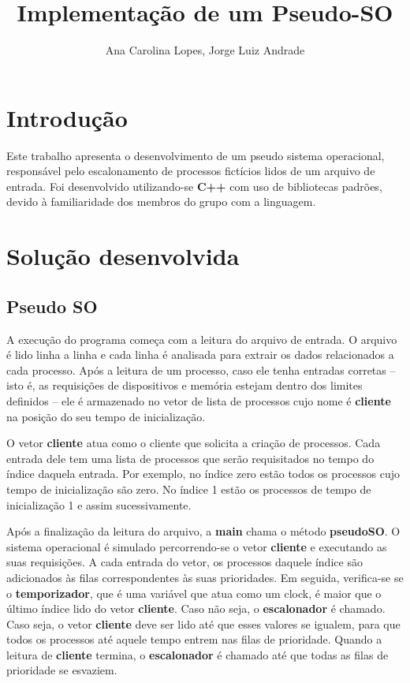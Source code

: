 \documentclass[a4paper]{article}
\title{Implementação de um Pseudo-SO}
\author{Ana Carolina Lopes, Jorge Luiz Andrade}
\date{}
\begin{document}
\maketitle

\section{Introdução}
Este trabalho apresenta o desenvolvimento de um pseudo sistema operacional, responsável pelo escalonamento de processos fictícios lidos de um arquivo de entrada. Foi desenvolvido utilizando-se \textbf{C++} com uso de bibliotecas padrões, devido à familiaridade dos membros do grupo com a linguagem. 

\section{Solução desenvolvida}
\subsection{Pseudo SO}
A execução do programa começa com a leitura do arquivo de entrada. O arquivo é lido linha a linha e cada linha é analisada para extrair os dados relacionados a cada processo. Após a leitura de um processo, caso ele tenha entradas corretas -- isto é, as requisições de dispositivos e memória estejam dentro dos limites definidos -- ele é armazenado no vetor de lista de processos cujo nome é \textbf{cliente} na posição do seu tempo de inicialização.

O vetor \textbf{cliente} atua como o cliente que solicita a criação de processos. Cada entrada dele tem uma lista de processos que serão requisitados no tempo do índice daquela entrada. Por exemplo, no índice zero estão todos os processos cujo tempo de inicialização são zero. No índice 1 estão os processos de tempo de inicialização 1 e assim sucessivamente.

Após a finalização da leitura do arquivo, a \textbf{main} chama o método \textbf{pseudoSO}.
O sistema operacional é simulado percorrendo-se o vetor \textbf{cliente} e executando as suas requisições. A cada entrada do vetor, os processos daquele índice são adicionados às filas correspondentes às suas prioridades. 
Em seguida, verifica-se se o \textbf{temporizador}, que é uma variável que atua como um clock, é maior que o último índice lido do vetor \textbf{cliente}. Caso não seja, o \textbf{escalonador} é chamado. Caso seja, o vetor \textbf{cliente} deve ser lido até que esses valores se igualem, para que todos os processos até aquele tempo entrem nas filas de prioridade. Quando a leitura de \textbf{cliente} termina, o \textbf{escalonador} é chamado até que todas as filas de prioridade se esvaziem.
\end{document}
